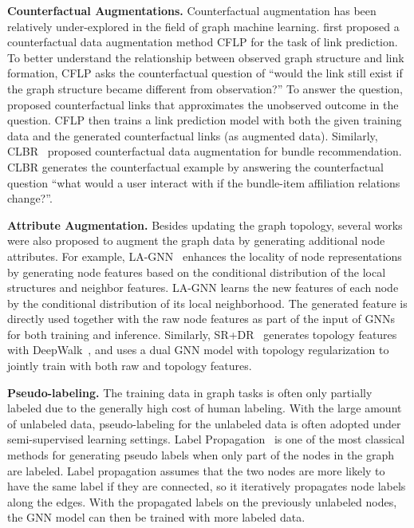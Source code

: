 \documentclass[11pt]{article}
\renewcommand\paragraph[1]{\vspace{0.05in} \noindent \textbf{#1.}}
\begin{document}
\paragraph{Counterfactual Augmentations}
Counterfactual augmentation has been relatively under-explored in the field of graph machine learning.
\citet{zhao2021counterfactual} first proposed a counterfactual data augmentation method CFLP for the task of link prediction. To better understand the relationship between observed graph structure and link formation, CFLP asks the counterfactual question of ``would the link still exist if the graph structure became different from observation?'' To answer the question, \citet{zhao2021counterfactual} proposed counterfactual links that approximates the unobserved outcome in the question. CFLP then trains a link prediction model with both the given training data and the generated counterfactual links (as augmented data). Similarly, CLBR~\citet{zhu2022data} proposed counterfactual data augmentation for bundle recommendation. CLBR generates the counterfactual example by answering the counterfactual question ``what would a user interact with if the bundle-item affiliation relations change?''.

\paragraph{Attribute Augmentation}
Besides updating the graph topology, several works were also proposed to augment the graph data by generating additional node attributes. For example, LA-GNN~\cite{liu2021local} enhances the locality of node representations by generating node features based on the conditional distribution of the local structures and neighbor features. LA-GNN learns the new features of each node by the conditional distribution of its local neighborhood. The generated feature is directly used together with the raw node features as part of the input of GNNs for both training and inference. Similarly, SR+DR~\cite{song2021topological} generates topology features with DeepWalk~\cite{perozzi2014deepwalk}, and uses a dual GNN model with topology regularization to jointly train with both raw and topology features.

\paragraph{Pseudo-labeling}
The training data in graph tasks is often only partially labeled due to the generally high cost of human labeling. With the large amount of unlabeled data, pseudo-labeling for the unlabeled data is often adopted under semi-supervised learning settings. Label Propagation~\cite{zhu2002learning,zhu2005semi,dong2021equivalence} is one of the most classical methods for generating pseudo labels when only part of the nodes in the graph are labeled. Label propagation assumes that the two nodes are more likely to have the same label if they are connected, so it iteratively propagates node labels along the edges. With the propagated labels on the previously unlabeled nodes, the GNN model can then be trained with more labeled data. 
\end{document}
